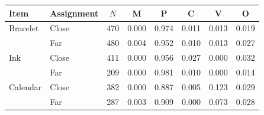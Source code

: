 \begin{tabular}{llcccccc}
\toprule
Item & Assignment & $N$ & M & P & C & V & O \\
\midrule
Bracelet & Close & 470 & 0.000 & 0.974 & 0.011 & 0.013 & 0.019 \\
 & Far & 480 & 0.004 & 0.952 & 0.010 & 0.013 & 0.027 \\
\addlinespace
Ink & Close & 411 & 0.000 & 0.956 & 0.027 & 0.000 & 0.032 \\
 & Far & 209 & 0.000 & 0.981 & 0.010 & 0.000 & 0.014 \\
\addlinespace
Calendar & Close & 382 & 0.000 & 0.887 & 0.005 & 0.123 & 0.029 \\
 & Far & 287 & 0.003 & 0.909 & 0.000 & 0.073 & 0.028 \\
\bottomrule
\end{tabular}

